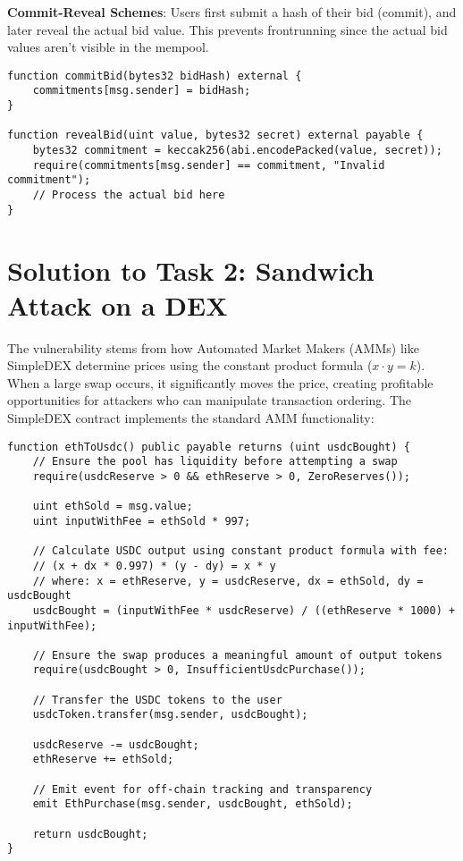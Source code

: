 \documentclass[12pt]{article}
\begin{document}
\textbf{Commit-Reveal Schemes}: Users first submit a hash of their bid (commit), and later reveal the actual bid value. This prevents frontrunning since the actual bid values aren't visible in the mempool.

\begin{verbatim}
function commitBid(bytes32 bidHash) external {
    commitments[msg.sender] = bidHash;
}

function revealBid(uint value, bytes32 secret) external payable {
    bytes32 commitment = keccak256(abi.encodePacked(value, secret));
    require(commitments[msg.sender] == commitment, "Invalid commitment");
    // Process the actual bid here
}
\end{verbatim}

\section*{Solution to Task 2: Sandwich Attack on a DEX}

The vulnerability stems from how Automated Market Makers (AMMs) like SimpleDEX determine prices using the constant product formula ($x \cdot y = k$). When a large swap occurs, it significantly moves the price, creating profitable opportunities for attackers who can manipulate transaction ordering. The SimpleDEX contract implements the standard AMM functionality:

\begin{lstlisting}[language=Solidity]
function ethToUsdc() public payable returns (uint usdcBought) {
    // Ensure the pool has liquidity before attempting a swap
    require(usdcReserve > 0 && ethReserve > 0, ZeroReserves());

    uint ethSold = msg.value;
    uint inputWithFee = ethSold * 997;

    // Calculate USDC output using constant product formula with fee: 
    // (x + dx * 0.997) * (y - dy) = x * y
    // where: x = ethReserve, y = usdcReserve, dx = ethSold, dy = usdcBought
    usdcBought = (inputWithFee * usdcReserve) / ((ethReserve * 1000) + inputWithFee);

    // Ensure the swap produces a meaningful amount of output tokens
    require(usdcBought > 0, InsufficientUsdcPurchase());

    // Transfer the USDC tokens to the user
    usdcToken.transfer(msg.sender, usdcBought);

    usdcReserve -= usdcBought;
    ethReserve += ethSold;

    // Emit event for off-chain tracking and transparency
    emit EthPurchase(msg.sender, usdcBought, ethSold);

    return usdcBought;
}
\end{lstlisting}
\end{document}
